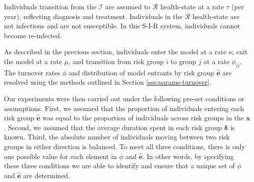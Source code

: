 Individuals transition from the $\mathcal{I}$ are assumed to $\mathcal{R}$ health-state 
at a rate $\tau$ (per year), reflecting diagnosis and treatment.
Individuals in the $\mathcal{R}$ health-state are not infectious and are 
not susceptible. In this S-I-R system, individuals cannot become re-infected.
\par
As described in the previous section, individuals %
enter the model at a rate $\nu$,
exit the model at a rate $\mu$,
and transition from risk group $i$ to group $j$ at a rate $\phi_{ij}$.
The turnover rates $\phi$ and distribution of model entrants by risk group $\bm{\hat{e}}$  %
are resolved using the methods outlined in
Section \ref{sss:params-turnover}. %

Our experiments were then carried out under the following pre-set conditions or assumptions.
First, we assumed that the proportion of individuals entering each risk group $\bm{\hat{e}}$ 
was equal to the proportion of individuals across risk groups in the $\bm{\hat{x}}$.
Second, we assumed that the average duration spent in each risk group $\bm{\delta}$ is known.
Third, the absolute number of individuals moving between two risk groups in either direction is balanced.
To meet all three conditions, there is only one possible value 
for each element in $\phi$ and $\bm{\hat{e}}$. In other words, by specifying these three conditions
we are able to identify and ensure that					%
a unique set of $\phi$ and $\bm{\hat{e}}$ are determined.

